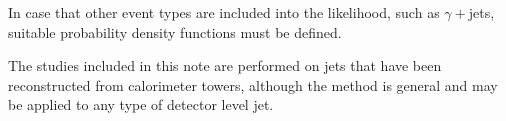 In case that other event types are included into the likelihood, such as $\gamma+$jets, suitable probability density functions must be defined.

The studies included in this note are performed on jets that have been reconstructed from calorimeter towers, although the method is general and may be applied to any type of detector level jet.

